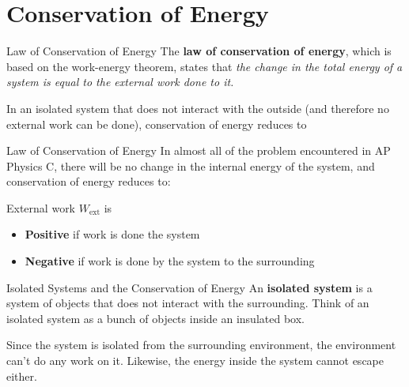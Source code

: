 \documentclass[12pt,compress,aspectratio=169]{beamer}
\begin{document}
\section{Conservation of Energy}

\begin{frame}{Law of Conservation of Energy}
  The \textbf{law of conservation of energy}, which is based on the work-energy
  theorem, states that \emph{the change in the total energy of a system is
    equal to the external work done to it.}


  In an isolated system that does not interact with the outside (and therefore
  no external work can be done), conservation of energy reduces to


\end{frame}



\begin{frame}{Law of Conservation of Energy}
  In almost all of the problem encountered in AP Physics C, there will be no
  change in the internal energy of the system, and conservation of energy
  reduces to:
  

  External work $W_\text{ext}$ is
  \begin{itemize}
  \item\textbf{Positive} if work is done  the system
  \item\textbf{Negative} if work is done  by the system to the
    surrounding
  \end{itemize}
\end{frame}


\begin{frame}{Isolated Systems and the Conservation of Energy}
  An \textbf{isolated system} is a system of objects that does not interact with
  the surrounding. Think of an isolated system as a bunch of objects inside an
  insulated box.
  \begin{center}
  \end{center}
  Since the system is isolated from the surrounding environment, the
  environment can't do any work on it. Likewise, the energy inside the system
  cannot escape either.
\end{frame}
\end{document}
